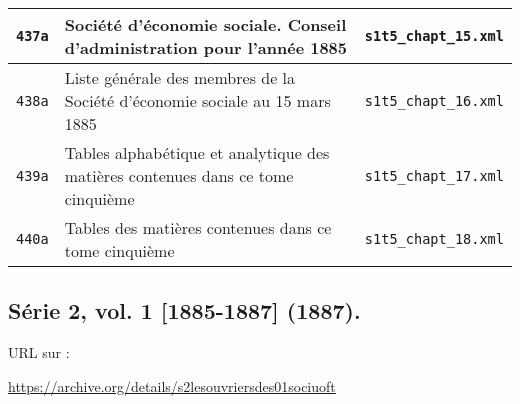 \begin{center}
\begin{longtable}{ | c | p{9.5cm} | c | }
\texttt{437a} & Société d'économie sociale. Conseil d'administration pour l'année 1885 & \texttt{s1t5\_chapt\_15.xml} \\ \hline
\texttt{438a} &  Liste générale des membres de la Société d'économie sociale au 15 mars 1885 & \texttt{s1t5\_chapt\_16.xml} \\ \hline
\texttt{439a} & Tables alphabétique et analytique des matières contenues dans ce tome cinquième & \texttt{s1t5\_chapt\_17.xml} \\ \hline
\texttt{440a} & Tables des matières contenues dans ce tome cinquième & \texttt{s1t5\_chapt\_18.xml} \\ \hline
\end{longtable}
\end{center}

\subsection{Série 2, vol. 1 [1885-1887] (1887).}
\label{mappings2t1}

URL sur \ia{} : 


\url{https://archive.org/details/s2lesouvriersdes01sociuoft}

